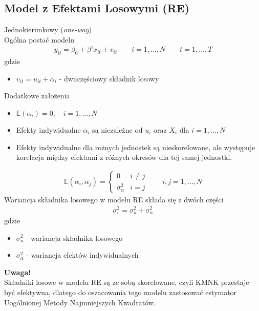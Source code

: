 \subsection{Model z Efektami Losowymi (RE)}
Jednokierunkowy (\textit{one-way})\\
Ogólna postać modelu
\begin{gather*}
y_{it}=\beta_0+\beta'x_{it}+v_{it}
\qquad i=1,\dots,N
\qquad t=1,\dots,T
\end{gather*}
gdzie
\begin{itemize}
\item $ v_{it}=u_{it}+\alpha_i $ - dwuczęściowy składnik losowy
\end{itemize}
Dodatkowe założenia
\begin{itemize}
\item $ \mathbb E (\alpha_i)=0,\quad i=1,\dots,N $
\item Efekty indywidualne $ \alpha_i $ są niezależne od $ u_i $ oraz $ X_i $ dla $ i=1,\dots,N $
\item Efekty indywidualne dla rożnych jednostek są nieskorelowane, ale występuje korelacja między efektami z różnych okresów dla tej samej jednostki.
\end{itemize}
\begin{gather*}
\mathbb E (\alpha_i,\alpha_j)=
\left \{
\begin{array}{ll}
	0               & i\neq j \\
	\sigma^2_\alpha & i=j
\end{array}
\right .
\qquad i,j=1,\dots,N
\end{gather*}
Wariancja składnika losowego w modelu RE składa się z dwóch części
\begin{gather*}
\sigma^2_v=\sigma^2_u+\sigma^2_\alpha
\end{gather*}
gdzie
\begin{itemize}
\item $ \sigma_u^2 $ - wariancja składnika losowego
\item $ \sigma_\alpha^2 $ - wariancja efektów indywidualnych
\end{itemize}
\textbf{Uwaga!}\\
Składniki losowe w modelu RE są ze sobą skorelowane, czyli KMNK przestaje być efektywna, dlatego do oszacowania tego modelu zastosować estymator Uogólnionej Metody Najmniejszych Kwadratów.

